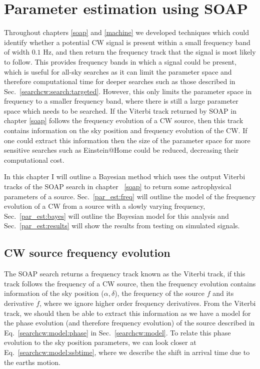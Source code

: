 \chapter{\label{par_est}Parameter estimation using SOAP}

Throughout chapters \ref{soap} and \ref{machine} we developed techniques which could identify whether a potential \gls{CW} signal is present within a small frequency band of width $0.1$ Hz, and then return the frequency track that the signal is most likely to follow.
This provides frequency bands in which a signal could be present, which is useful for all-sky searches as it can limit the parameter space and therefore computational time for deeper searches such as those described in Sec.~\ref{searchcw:search:targeted}. 
However, this only limits the parameter space in frequency to a smaller frequency band, where there is still a large parameter space which needs to be searched.
If the Viterbi track returned by SOAP in chapter \ref{soap} follows the frequency evolution of a \gls{CW} source, then this track contains information on the sky position and frequency evolution of the \gls{CW}.
If one could extract this information then the size of the parameter space for more sensitive searches such as Einstein@Home could be reduced, decreasing their computational cost.

In this chapter I will outline a Bayesian method which uses the output Viterbi tracks of the SOAP search in chapter ~\ref{soap} to return some astrophysical parameters of a source.
Sec.~\ref{par_est:freq} will outline the model of the frequency evolution of a \gls{CW} from a source with a slowly varying frequency,
Sec.~\ref{par_est:bayes} will outline the Bayesian model for this analysis and Sec.~\ref{par_est:results} will show the results from testing on simulated signals.

\section{\label{par_est:freq}\gls{CW} source frequency evolution}

The SOAP search returns a frequency track known as the Viterbi track, if this track follows the frequency of a \gls{CW} source, then the frequency evolution contains information of the sky position ($\alpha, \delta$), the frequency of the source $f$ and its derivative $\dot{f}$, where we ignore higher order frequency derivatives.
From the Viterbi track, we should then be able to extract this information as we have a model for the phase evolution (and therefore frequency evolution) of the source described in Eq.~\ref{searchcw:model:phase} in Sec.~\ref{searchcw:model}.
To relate this phase evolution to the sky position parameters, we can look closer at Eq.~\ref{searchcw:model:ssbtime}, where we describe the shift in arrival time due to the earths motion. 


